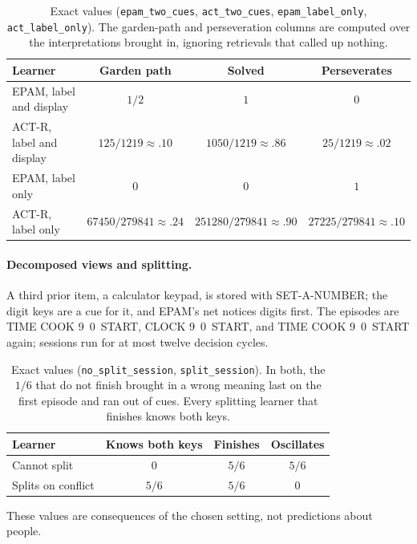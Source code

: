 \documentclass[11pt]{article}
\newcommand{\lean}[1]{\texttt{#1}}
\begin{document}
\begin{table}[h]
\centering
\small
\begin{tabular}{@{}lccc@{}}
\toprule
Learner & Garden path & Solved & Perseverates \\
\midrule
EPAM, label and display & $1/2$ & $1$ & $0$ \\
ACT-R, label and display & $125/1219 \approx .10$ & $1050/1219 \approx .86$ & $25/1219 \approx .02$ \\
EPAM, label only & $0$ & $0$ & $1$ \\
ACT-R, label only & $67450/279841 \approx .24$ & $251280/279841 \approx .90$ & $27225/279841 \approx .10$ \\
\bottomrule
\end{tabular}
\caption{Exact values (\lean{epam\_two\_cues}, \lean{act\_two\_cues}, \lean{epam\_label\_only}, \lean{act\_label\_only}). The garden-path and perseveration columns are computed over the interpretations brought in, ignoring retrievals that called up nothing.}
\label{tab:values}
\end{table}

\paragraph{Decomposed views and splitting.} A third prior item, a calculator keypad, is stored with SET-A-NUMBER; the digit keys are a cue for it, and EPAM's net notices digits first. The episodes are TIME COOK 9~0~START, CLOCK 9~0~START, and TIME COOK 9~0~START again; sessions run for at most twelve decision cycles.

\begin{table}[h]
\centering
\small
\begin{tabular}{@{}lccc@{}}
\toprule
Learner & Knows both keys & Finishes & Oscillates \\
\midrule
Cannot split & $0$ & $5/6$ & $5/6$ \\
Splits on conflict & $5/6$ & $5/6$ & $0$ \\
\bottomrule
\end{tabular}
\caption{Exact values (\lean{no\_split\_session}, \lean{split\_session}). In both, the $1/6$ that do not finish brought in a wrong meaning last on the first episode and ran out of cues. Every splitting learner that finishes knows both keys.}
\label{tab:diff}
\end{table}

These values are consequences of the chosen setting, not predictions about people.
\end{document}
